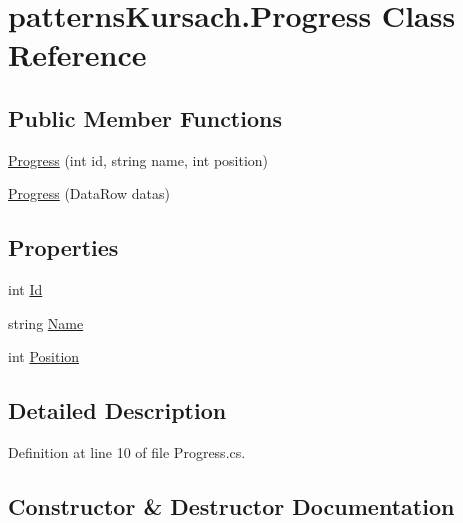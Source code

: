 \hypertarget{classpatterns_kursach_1_1_progress}{}\section{patterns\+Kursach.\+Progress Class Reference}
\label{classpatterns_kursach_1_1_progress}
\subsection*{Public Member Functions}
\begin{DoxyCompactItemize}
\item 
\mbox{\hyperlink{classpatterns_kursach_1_1_progress_a5c6803058985cb88e49a24c9c8816db0}{Progress}} (int id, string name, int position)
\item 
\mbox{\hyperlink{classpatterns_kursach_1_1_progress_abfb0c1805d881ed4a36a08288093ac57}{Progress}} (Data\+Row datas)
\end{DoxyCompactItemize}
\subsection*{Properties}
\begin{DoxyCompactItemize}
\item 
int \mbox{\hyperlink{classpatterns_kursach_1_1_progress_ae639d8ba609612325b731e91a901927a}{Id}}
\item 
string \mbox{\hyperlink{classpatterns_kursach_1_1_progress_a8f55b8fc822cec0cc2cfb1b9d5c4c535}{Name}}
\item 
int \mbox{\hyperlink{classpatterns_kursach_1_1_progress_ac6f738598992b81afb7bab6b646e8714}{Position}}
\end{DoxyCompactItemize}


\subsection{Detailed Description}


Definition at line 10 of file Progress.\+cs.



\subsection{Constructor \& Destructor Documentation}
\mbox{\label{classpatterns_kursach_1_1_progress_a5c6803058985cb88e49a24c9c8816db0}} 

